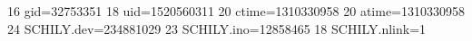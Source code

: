 16 gid=32753351
18 uid=1520560311
20 ctime=1310330958
20 atime=1310330958
24 SCHILY.dev=234881029
23 SCHILY.ino=12858465
18 SCHILY.nlink=1
